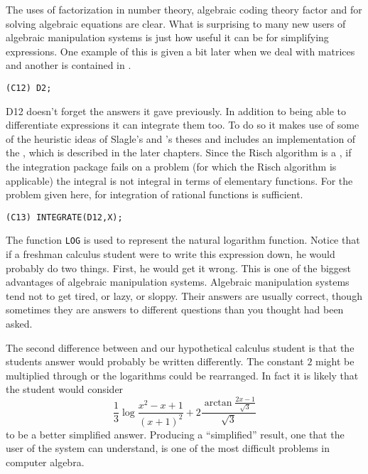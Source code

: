 The uses of factorization in number theory, algebraic coding theory
factor and for solving algebraic equations are clear.  What is
surprising to many new users of algebraic manipulation systems is just
how useful it can be for simplifying expressions.  One example of this
is given a bit later when we deal with matrices and another is
contained in .
\begin{verbatim}
(C12) D2;
\end{verbatim}
 {D12} 
{\Macsyma} doesn't forget the answers it gave previously.  In addition
to being able to differentiate expressions it can integrate them too.
To do so it makes use of some of the heuristic ideas of Slagle's and
{\MosesJ}'s theses \cite{Slagle:Thesis,Moses68} and includes an
implementation of the , which is described in
the later chapters.  Since the Risch algorithm is a , if the integration package fails on a problem (for which
the Risch algorithm is applicable) the integral is not integral in
terms of elementary functions.  For the problem given here,
 for integration of rational functions is
sufficient.
\begin{verbatim}
(C13) INTEGRATE(D12,X);
\end{verbatim}
The function {\tt LOG} is used to represent the natural logarithm function.
Notice that if a freshman calculus student were to write this expression
down, he would probably do two things.  First, he would get it wrong.  This
is one of the biggest advantages of algebraic manipulation systems.
Algebraic manipulation systems tend not to get tired, or lazy, or
sloppy.  Their answers are usually correct, though sometimes they are
answers to different questions than you thought had been asked.

The second difference between {\Macsyma} and our hypothetical calculus
student is that the students answer would probably be written differently.
The constant $2$ might be multiplied through or the logarithms could be
rearranged.  In fact it is likely that the student would consider 
\[
\frac{1}{3} \log \frac{x^2 - x + 1}{(x+1)^2} 
+ 2 \frac{\arctan \frac{2 x - 1}{\sqrt{3}} }{\sqrt{3}}
\]
to be a better simplified answer.  Producing a ``simplified'' result, one
that the user of the system can understand, is one of the most difficult
problems in computer algebra.  

